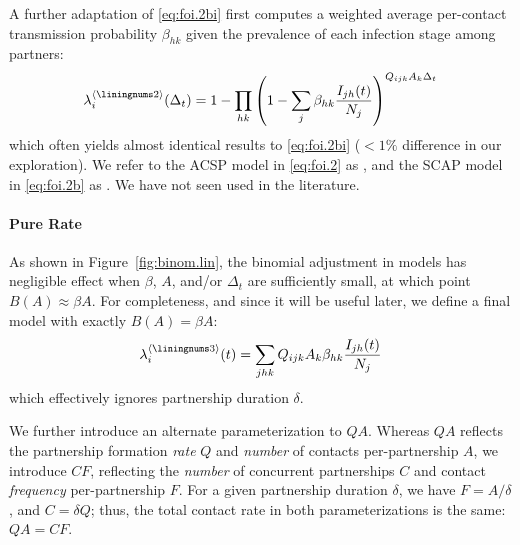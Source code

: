 A further adaptation of \eqref{eq:foi.2bi} first computes
a weighted average per-contact transmission probability $\beta_{hk}$
given the prevalence of each infection stage among partners:
\begin{equation}\label{eq:foi.2b}
  \lambda_i^{\case{2}}(\Delta_t) =
  1 - \prod_{hk}{\left(1 - \sum_j \beta_{hk}\frac{I_{jh}(t)}{N_j}\right)}^{Q_{ijk} A_k \Delta_t}
\end{equation}
which often yields almost identical results to \eqref{eq:foi.2bi}
($<1\%$ difference in our exploration).
We refer to the ACSP model in \eqref{eq:foi.2} as ,
and the SCAP model in \eqref{eq:foi.2b} as .
We have not seen  used in the literature.
\paragraph{ Pure Rate}
As shown in Figure~\ref{fig:binom.lin}, the binomial adjustment in models 
has negligible effect when $\beta$, $A$, and/or $\Delta_t$ are sufficiently small,
at which point $B(A) \approx \beta A$.
For completeness, and since it will be useful later,
we define a final model  with exactly $B(A) = \beta A$:
\begin{equation}\label{eq:foi.3}
  \lambda_i^{\case{3}}(t) = \sum_{jhk} Q_{ijk} A_k \beta_{hk} \frac{I_{jh}(t)}{N_j}
\end{equation}
which effectively ignores partnership duration $\delta$.
\par
We further introduce an alternate parameterization to $QA$.
Whereas $QA$ reflects the partnership formation \emph{rate} $Q$
and \emph{number} of contacts per-partnership $A$,
we introduce $CF$, reflecting the \emph{number} of concurrent partnerships $C$
and contact \emph{frequency} per-partnership $F$.
For a given partnership duration $\delta$, we have $F = A/\delta$, and $C = \delta Q$;
thus, the total contact rate in both parameterizations is the same: $QA = CF$.
